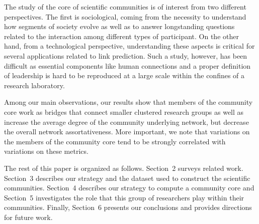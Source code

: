 The study of the core of scientific communities is of interest from two different perspectives.  The first is sociological, coming from the necessity to understand how
segments of society evolve as well as to answer longstanding  questions related to the interaction among different types of participant. On the other hand, from a technological perspective,
understanding these aspects is critical for several applications related to link prediction. Such a study, however, has been difficult as essential components like human connections 
and a proper definition of leadership is hard to be reproduced at a large scale within the confines of a research laboratory.

Among our main observations, our results show that members of the community core work as bridges that connect smaller clustered research groups as well as increase the average
degree of the community underlying network, but decrease the overall network assortativeness. More important, we note that variations on the members of the community core tend to be strongly correlated
with variations on these metrics.

The rest of this paper is organized as follows. Section~2 surveys related work. Section~3 describes our strategy and the dataset used to construct the 
scientific communities.  Section~4 describes our strategy to compute a community core and Section~5 investigates the
role that this group of researchers play within their communities.  Finally, Section~6 presents our conclusions and provides directions for future work. 




